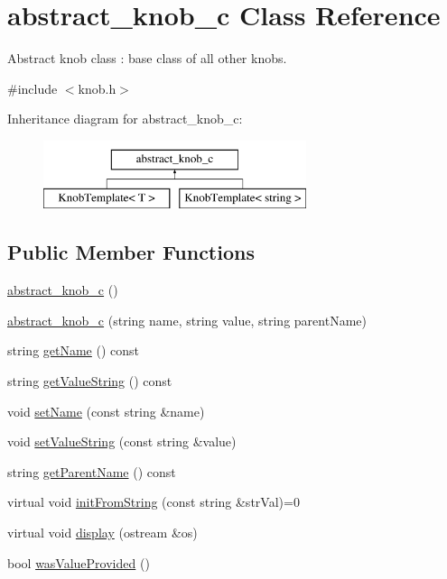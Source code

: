 \hypertarget{classabstract__knob__c}{
\section{abstract\_\-knob\_\-c Class Reference}
\label{classabstract__knob__c}
}


Abstract knob class : base class of all other knobs.  




{\ttfamily \#include $<$knob.h$>$}

Inheritance diagram for abstract\_\-knob\_\-c:\begin{figure}[H]
\begin{center}
\leavevmode
\includegraphics[height=2.000000cm]{classabstract__knob__c}
\end{center}
\end{figure}
\subsection*{Public Member Functions}
\begin{DoxyCompactItemize}
\item 
\hyperlink{classabstract__knob__c_a28a06d1583abf934dbbf7a5a1f7a5914}{abstract\_\-knob\_\-c} ()
\item 
\hyperlink{classabstract__knob__c_acfcc8293c8f93c28012500c56ef2144e}{abstract\_\-knob\_\-c} (string name, string value, string parentName)
\item 
string \hyperlink{classabstract__knob__c_ad1f915ecee7975d85279f7f040b049a7}{getName} () const 
\item 
string \hyperlink{classabstract__knob__c_af5b9c320db0a80508fe435d8e37218b7}{getValueString} () const 
\item 
void \hyperlink{classabstract__knob__c_afe502dfe54a0295aca6352730dcc5dee}{setName} (const string \&name)
\item 
void \hyperlink{classabstract__knob__c_a3dea088397b6ce8baa5f45bfea84fa24}{setValueString} (const string \&value)
\item 
string \hyperlink{classabstract__knob__c_a9a2be7153e2344422ed920bc4c2c86e9}{getParentName} () const 
\item 
virtual void \hyperlink{classabstract__knob__c_ad69620dc8974d5c659c6a7828d460e28}{initFromString} (const string \&strVal)=0
\item 
virtual void \hyperlink{classabstract__knob__c_aaee4499a56d94f1831e7945274dfac8b}{display} (ostream \&os)
\item 
bool \hyperlink{classabstract__knob__c_a052bce404094607be148da67f16051a1}{wasValueProvided} ()
\end{DoxyCompactItemize}
